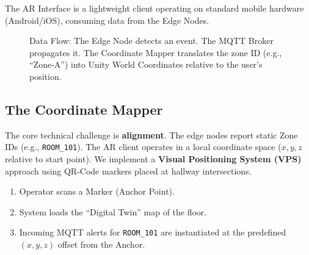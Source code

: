\documentclass[conference]{IEEEtran}
\begin{document}
The AR Interface is a lightweight client operating on standard mobile hardware (Android/iOS), consuming data from the Edge Nodes.

\begin{figure}[htbp]
\centering
{}
\caption{Data Flow: The Edge Node detects an event. The MQTT Broker propagates it. The Coordinate Mapper translates the zone ID (e.g., ``Zone-A'') into Unity World Coordinates relative to the user's position.}
\label{fig:arch}
\end{figure}

\subsection{The Coordinate Mapper}
The core technical challenge is \textbf{alignment}. The edge nodes report static Zone IDs (e.g., \texttt{ROOM\_101}). The AR client operates in a local coordinate space ($x,y,z$ relative to start point).
We implement a \textbf{Visual Positioning System (VPS)} approach using QR-Code markers placed at hallway intersections.
\begin{enumerate}
    \item Operator scans a Marker (Anchor Point).
    \item System loads the ``Digital Twin'' map of the floor.
    \item Incoming MQTT alerts for \texttt{ROOM\_101} are instantiated at the predefined $(x,y,z)$ offset from the Anchor.
\end{enumerate}
\end{document}
